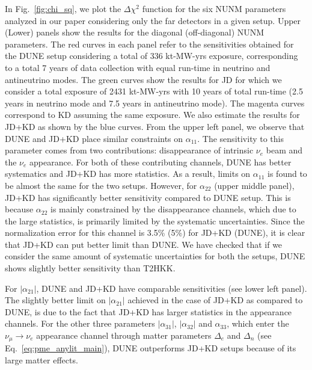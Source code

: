 \documentclass[11pt,a4paper]{article}
\newcommand{\aee}{\ensuremath{\alpha_{11}}}
\newcommand{\ame}{\ensuremath{\alpha_{21}}}
\newcommand{\amm}{\ensuremath{\alpha_{22}}}
\newcommand{\ate}{\ensuremath{\alpha_{31}}}
\newcommand{\atm}{\ensuremath{\alpha_{32}}}
\newcommand{\att}{\ensuremath{\alpha_{33}}}
\begin{document}
In Fig.~\ref{fig:chi_sq}, we plot the $\Delta \chi^2$ function for the six NUNM parameters analyzed in our paper considering only the far detectors in a given setup. Upper (Lower)  panels show the results for the diagonal (off-diagonal) NUNM parameters. The red curves in  each panel refer to the sensitivities obtained for the DUNE setup considering a total of $336$ kt-MW-yrs exposure, corresponding to a total 7 years of data collection with equal run-time in neutrino and antineutrino modes. The green curves show the results for JD  for which we consider a total exposure of 2431 kt-MW-yrs with 10 years of total run-time (2.5 years in neutrino mode and 7.5 years in antineutrino mode). The magenta curves correspond to KD assuming the same  exposure. We also estimate the results for JD+KD as shown by the blue curves.
 From the upper left panel, we observe that DUNE and JD+KD place similar constraints on $\aee$. The sensitivity to this parameter comes from two contributions: disappearance of intrinsic $\nu_e$ beam and the $\nu_e$ appearance.
 For both of these contributing channels, 
 DUNE has better systematics and JD+KD has more statistics. As a result, limits on $\alpha_{11}$ is found to be almost the same for the two setups. However, for $\amm$ (upper middle panel), JD+KD has significantly better sensitivity compared to DUNE setup. This is because $\amm$ is mainly constrained by the disappearance channels, which due to the large statistics, is primarily limited by the systematic uncertainties. Since the normalization error for this channel is 3.5\% (5\%) for JD+KD (DUNE), it is clear that JD+KD can put better limit than DUNE. We have checked that if we consider the same amount of systematic uncertainties for both the setups, DUNE shows slightly better sensitivity than T2HKK.
 
For $|\ame|$, DUNE and JD+KD have comparable sensitivities (see lower left panel). The slightly better limit on $|\alpha_{21}|$ achieved in the case of JD+KD as compared to DUNE, is due to the fact that JD+KD has larger statistics in the appearance channels. For the other three parameters $|\ate|$, $|\atm|$ and $\att$, which enter the $\nu_{\mu}\rightarrow\nu_{e}$ appearance channel through matter parameters $\Delta_{e}$ and $\Delta_n$ (see Eq.~\ref{eq:pme_anylit_main}), DUNE outperforms JD+KD setups because of its large matter effects.
\end{document}
